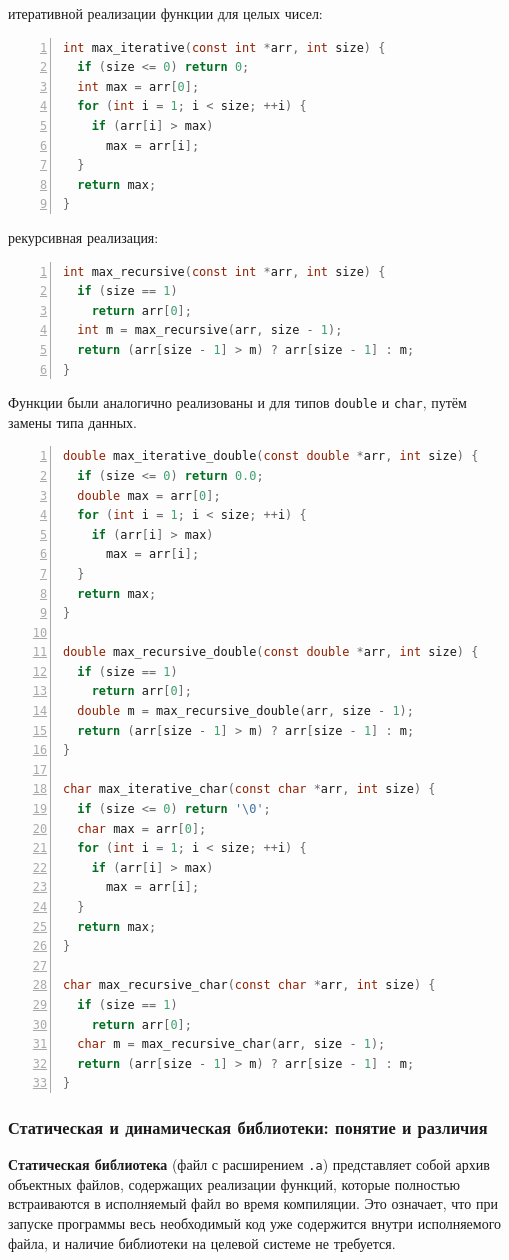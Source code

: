  итеративной реализации функции для целых чисел:
\begin{lstlisting}[language=C, numbers=left, caption=Итеративная реализация max для int]
int max_iterative(const int *arr, int size) {
  if (size <= 0) return 0;
  int max = arr[0];
  for (int i = 1; i < size; ++i) {
    if (arr[i] > max)
      max = arr[i];
  }
  return max;
}
\end{lstlisting}

 рекурсивная реализация:
\begin{lstlisting}[language=C, numbers=left, caption=Рекурсивная реализация max для int]
int max_recursive(const int *arr, int size) {
  if (size == 1)
    return arr[0];
  int m = max_recursive(arr, size - 1);
  return (arr[size - 1] > m) ? arr[size - 1] : m;
}
\end{lstlisting}

Функции были аналогично реализованы и для типов \texttt{double} и \texttt{char}, путём замены типа данных.

\begin{lstlisting}[language=C, numbers=left, caption=Реализация max для double и char]
double max_iterative_double(const double *arr, int size) {
  if (size <= 0) return 0.0;
  double max = arr[0];
  for (int i = 1; i < size; ++i) {
    if (arr[i] > max)
      max = arr[i];
  }
  return max;
}

double max_recursive_double(const double *arr, int size) {
  if (size == 1)
    return arr[0];
  double m = max_recursive_double(arr, size - 1);
  return (arr[size - 1] > m) ? arr[size - 1] : m;
}

char max_iterative_char(const char *arr, int size) {
  if (size <= 0) return '\0';
  char max = arr[0];
  for (int i = 1; i < size; ++i) {
    if (arr[i] > max)
      max = arr[i];
  }
  return max;
}

char max_recursive_char(const char *arr, int size) {
  if (size == 1)
    return arr[0];
  char m = max_recursive_char(arr, size - 1);
  return (arr[size - 1] > m) ? arr[size - 1] : m;
}
\end{lstlisting}

\subsubsection*{Статическая и динамическая библиотеки: понятие и различия}

\textbf{Статическая библиотека} (файл с расширением \texttt{.a}) представляет собой архив объектных файлов, содержащих реализации функций, которые полностью встраиваются в исполняемый файл во время компиляции. Это означает, что при запуске программы весь необходимый код уже содержится внутри исполняемого файла, и наличие библиотеки на целевой системе не требуется.

